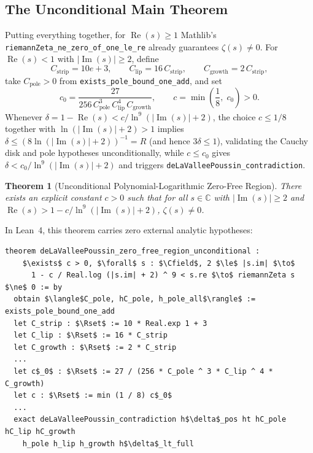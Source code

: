 \documentclass[11pt,a4paper]{article}
\newtheorem{theorem}{Theorem}[section]
\theoremstyle{definition}
\newcommand{\Rset}{\mathbb{R}}
\newcommand{\Cfield}{\mathbb{C}}
\begin{document}
\subsection{The Unconditional Main Theorem}

Putting everything together, for $\operatorname{Re}(s) \ge 1$ Mathlib's \texttt{riemannZeta\_ne\_zero\_of\_one\_le\_re} already guarantees $\zeta(s) \ne 0$. For $\operatorname{Re}(s) < 1$ with $|{\operatorname{Im}}(s)| \ge 2$, define
\begin{equation}
C_{\text{strip}} = 10e + 3, \qquad C_{\text{lip}} = 16\,C_{\text{strip}}, \qquad C_{\text{growth}} = 2\,C_{\text{strip}},
\end{equation}
take $C_{\text{pole}} > 0$ from \texttt{exists\_pole\_bound\_one\_add}, and set
\begin{equation}
c_0 = \frac{27}{256 \, C_{\text{pole}}^3 \, C_{\text{lip}}^4 \, C_{\text{growth}}}, \qquad c = \min\!\left(\frac{1}{8},\; c_0\right) > 0.
\end{equation}
Whenever $\delta = 1 - \operatorname{Re}(s) < c / \ln^9(|{\operatorname{Im}}(s)| + 2)$, the choice $c \le 1/8$ together with $\ln(|{\operatorname{Im}}(s)|+2) > 1$ implies $\delta \le (8\ln(|{\operatorname{Im}}(s)|+2))^{-1} = R$ (and hence $3\delta \le 1$), validating the Cauchy disk and pole hypotheses unconditionally, while $c \le c_0$ gives $\delta < c_0 / \ln^9(|{\operatorname{Im}}(s)|+2)$ and triggers \texttt{deLaValleePoussin\_contradiction}.

\begin{theorem}[Unconditional Polynomial-Logarithmic Zero-Free Region]\label{thm:unconditional_zfr}
There exists an explicit constant $c > 0$ such that for all $s \in \Cfield$ with $|{\operatorname{Im}}(s)| \ge 2$ and $\operatorname{Re}(s) > 1 - c / \ln^9(|{\operatorname{Im}}(s)|+2)$, $\zeta(s) \ne 0$.
\end{theorem}

In Lean~4, this theorem carries zero external analytic hypotheses:
\begin{lstlisting}
theorem deLaValleePoussin_zero_free_region_unconditional :
    $\exists$ c > 0, $\forall$ s : $\Cfield$, 2 $\le$ |s.im| $\to$
      1 - c / Real.log (|s.im| + 2) ^ 9 < s.re $\to$ riemannZeta s $\ne$ 0 := by
  obtain $\langle$C_pole, hC_pole, h_pole_all$\rangle$ := exists_pole_bound_one_add
  let C_strip : $\Rset$ := 10 * Real.exp 1 + 3
  let C_lip : $\Rset$ := 16 * C_strip
  let C_growth : $\Rset$ := 2 * C_strip
  ...
  let c$_0$ : $\Rset$ := 27 / (256 * C_pole ^ 3 * C_lip ^ 4 * C_growth)
  let c : $\Rset$ := min (1 / 8) c$_0$
  ...
  exact deLaValleePoussin_contradiction h$\delta$_pos ht hC_pole hC_lip hC_growth
    h_pole h_lip h_growth h$\delta$_lt_full
\end{lstlisting}
\end{document}
